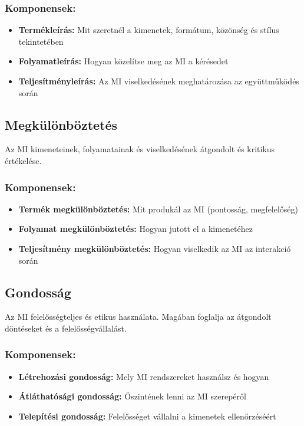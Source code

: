 \documentclass[a4paper, 11pt]{article}
\begin{document}
\begin{multicols}{2}
\subsubsection{Komponensek:}
\begin{itemize}
\item \textbf{Termékleírás:} Mit szeretnél a kimenetek, formátum, közönség és stílus tekintetében
\item \textbf{Folyamatleírás:} Hogyan közelítse meg az MI a kérésedet
\item \textbf{Teljesítményleírás:} Az MI viselkedésének meghatározása az együttműködés során
\end{itemize}

\subsection{Megkülönböztetés}
Az MI kimeneteinek, folyamatainak és viselkedésének átgondolt és kritikus értékelése.

\subsubsection{Komponensek:}
\begin{itemize}
\item \textbf{Termék megkülönböztetés:} Mit produkál az MI (pontosság, megfelelőség)
\item \textbf{Folyamat megkülönböztetés:} Hogyan jutott el a kimenetéhez
\item \textbf{Teljesítmény megkülönböztetés:} Hogyan viselkedik az MI az interakció során
\end{itemize}

\subsection{Gondosság}
Az MI felelősségteljes és etikus használata. Magában foglalja az átgondolt döntéseket és a felelősségvállalást.

\subsubsection{Komponensek:}
\begin{itemize}
\item \textbf{Létrehozási gondosság:} Mely MI rendszereket használsz és hogyan
\item \textbf{Átláthatósági gondosság:} Őszintének lenni az MI szerepéről
\item \textbf{Telepítési gondosság:} Felelősséget vállalni a kimenetek ellenőrzéséért
\end{itemize}


\end{multicols}
\end{document}
